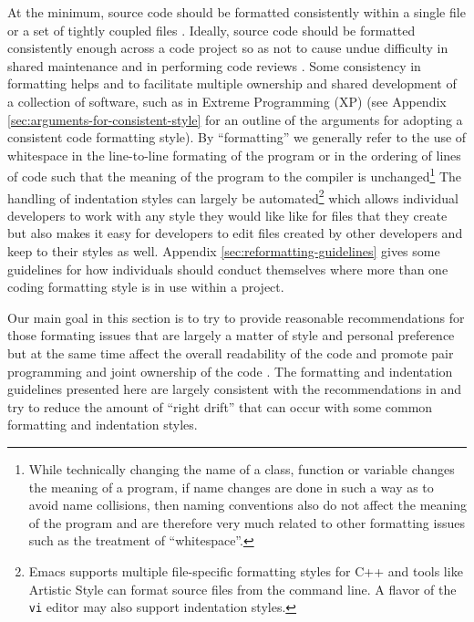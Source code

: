 At the minimum, source code should be formatted consistently within a single
file or a set of tightly coupled files {}\cite[Item 0]{C++CodingStandards05}.
Ideally, source code should be formatted consistently enough across a code
project so as not to cause undue difficulty in shared maintenance and in
performing code reviews {}\cite{CodeComplete2nd04}.  Some consistency in
formatting helps and to facilitate multiple ownership and shared development
of a collection of software, such as in Extreme Programming (XP)
{}\cite{ExtremeProgrammingExplained99} (see Appendix
{}\ref{sec:arguments-for-consistent-style} for an outline of the arguments for
adopting a consistent code formatting style).  By ``formatting'' we generally
refer to the use of whitespace in the line-to-line formating of the program or
in the ordering of lines of code such that the meaning of the program to the
compiler is unchanged\footnote{While technically changing the name of a class,
function or variable changes the meaning of a program, if name changes are
done in such a way as to avoid name collisions, then naming conventions also
do not affect the meaning of the program and are therefore very much related
to other formatting issues such as the treatment of ``whitespace''.}  The
handling of indentation styles can largely be automated\footnote{Emacs
supports multiple file-specific formatting styles for C++ and tools like
Artistic Style {}\cite{ArtisticStyle} can format source files from the command
line.  A flavor of the {}\texttt{vi} editor may also support indentation
styles. } which allows individual developers to work with any style they would
like like for files that they create but also makes it easy for developers to
edit files created by other developers and keep to their styles as well.
Appendix {}\ref{sec:reformatting-guidelines} gives some guidelines for how
individuals should conduct themselves where more than one coding formatting
style is in use within a project.

Our main goal in this section is to try to provide reasonable recommendations
for those formating issues that are largely a matter of style and personal
preference but at the same time affect the overall readability of the code and
promote pair programming and joint ownership of the code
{}\cite{ExtremeProgrammingExplained99}.  The formatting and indentation
guidelines presented here are largely consistent with the recommendations in
{}\cite[Chapter 31]{CodeComplete2nd04} and try to reduce the amount of ``right
drift'' that can occur with some common formatting and indentation styles.

